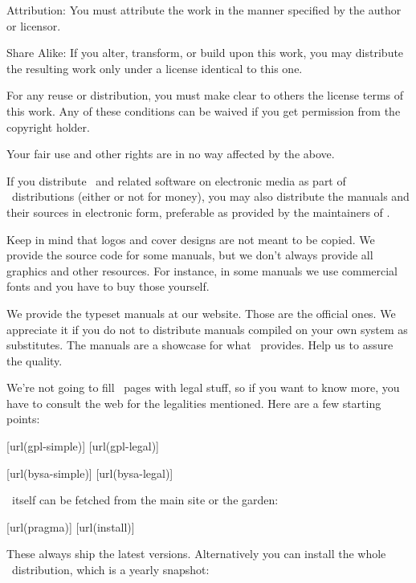 {\sc Attribution:} You must attribute the work in the manner specified by the
author or licensor.

{\sc Share Alike:} If you alter, transform, or build upon this work, you may
distribute the resulting work only under a license identical to this one.

\startitemize
    \startitem
        For any reuse or distribution, you must make clear to others the license
        terms of this work.
    \stopitem
    \startitem
        Any of these conditions can be waived if you get permission from the
        copyright holder.
    \stopitem
\stopitemize

Your fair use and other rights are in no way affected by the above.
\stopcolor

If you distribute \CONTEXT\ and related software on electronic media as part of
\TEX\ distributions (either or not for money), you may also distribute the
manuals and their sources in electronic form, preferable as provided by the
maintainers of \CONTEXT.

Keep in mind that logos and cover designs are not meant to be copied. We provide
the source code for some manuals, but we don't always provide all graphics and
other resources. For instance, in some manuals we use commercial fonts and you
have to buy those yourself.

We provide the typeset manuals at our website. Those are the official ones. We
appreciate it if you do not to distribute manuals compiled on your own system as
substitutes. The manuals are a showcase for what \CONTEXT\ provides. Help us to
assure the quality.

\stopsubject

\startsubject[title={More information}]

We're not going to fill ~pages with legal stuff, so if you want to
know more, you have to consult the web for the legalities mentioned. Here are a
few starting points:

\startlines
{}[url(gpl-simple)]
[url(gpl-legal)]
\stoplines

\startlines
{}[url(bysa-simple)]
[url(bysa-legal)]
\stoplines

\CONTEXT\ itself can be fetched from the main site or the garden:

\startlines
\goto{\url[pragma]}[url(pragma)]
\goto{\url[install]}[url(install)]
\stoplines

These always ship the latest versions. Alternatively you can install the whole
\TEX\ distribution, which is a yearly snapshot:

